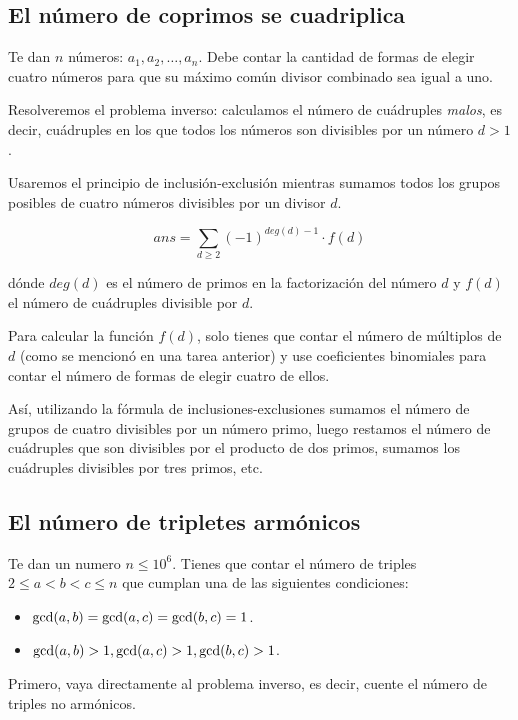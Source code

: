 \subsection{El número de coprimos se cuadriplica}

Te dan $n$ números: $a_1, a_2, \ldots, a_n$. Debe contar la cantidad de formas de elegir cuatro números para que su máximo común divisor combinado sea igual a uno.

Resolveremos el problema inverso: calculamos el número de cuádruples \emph{malos}, es decir, cuádruples en los que todos los números son divisibles por un número $d > 1$.

Usaremos el principio de inclusión-exclusión mientras sumamos todos los grupos posibles de cuatro números divisibles por un divisor $d$.

$$ans = \sum_{d \ge 2} (-1)^{deg(d)-1} \cdot f(d)$$

dónde $deg(d)$ es el número de primos en la factorización del número $d$ y $f(d)$ el número de cuádruples divisible por $d$.

Para calcular la función $f(d)$, solo tienes que contar el número de múltiplos de $d$ (como se mencionó en una tarea anterior) y use coeficientes binomiales para contar el número de formas de elegir cuatro de ellos.

Así, utilizando la fórmula de inclusiones-exclusiones sumamos el número de grupos de cuatro divisibles por un número primo, luego restamos el número de cuádruples que son divisibles por el producto de dos primos, sumamos los cuádruples divisibles por tres primos, etc.


\subsection{El número de tripletes armónicos}

Te dan un numero $n \le 10^6$. Tienes que contar el número de triples $2 \le a < b < c \le n$ que cumplan una de las siguientes condiciones:

\begin{itemize}
	\item ${\rm gcd}(a,b) = {\rm gcd}(a,c) = {\rm gcd}(b,c) = 1$.
	\item ${\rm gcd}(a,b) > 1, {\rm gcd}(a,c) > 1, {\rm gcd}(b,c) > 1$.
\end{itemize}

Primero, vaya directamente al problema inverso, es decir, cuente el número de triples no armónicos.

